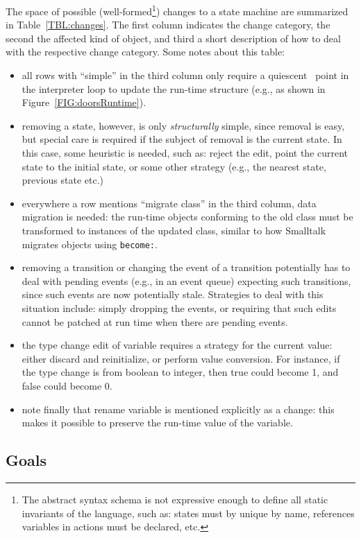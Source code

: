 \documentclass[english,submission]{programming}
\begin{document}
The space of possible (well-formed\footnote{The abstract syntax schema is not expressive enough to define all static invariants of the language, such as: states must by unique by name, references variables in actions must be declared, etc.}) changes to a state machine are summarized in Table~\ref{TBL:changes}.
The first column indicates the change category, the second the affected kind of object, and third a short description of how to deal with the respective change category. Some notes about this table:
\begin{itemize}
\item all rows with ``simple'' in the third column only require a quiescent~\cite{Tranquility} point in the interpreter loop to update the run-time structure (e.g., as shown in Figure~\ref{FIG:doorsRuntime}).
\item removing a state, however, is only \textit{structurally} simple, since removal is easy, but special care is required if the subject of removal is the current state. In this case, some heuristic is needed, such as: reject the edit, point the current state to the initial state, or some other strategy (e.g., the nearest state, previous state etc.)
\item everywhere a row mentions ``migrate class'' in the third column, data migration is needed: the run-time objects conforming to the old class must be transformed to instances of the updated class, similar to how Smalltalk migrates objects using \lstinline{become:}.
\item removing a transition or changing the event of a transition potentially has to deal with pending events (e.g., in an event queue) expecting such transitions, since such events are now potentially stale. Strategies to deal with this situation include: simply dropping the events, or requiring that such edits cannot be patched at run time when there are pending events.
\item the type change edit of variable requires a strategy for the current value: either discard and reinitialize, or perform value conversion. For instance, if the type change is from boolean to integer, then true could become 1, and false could become 0.
\item note finally that rename variable is mentioned explicitly as a change: this makes it possible to preserve the run-time value of the variable.
\end{itemize}

\subsection{Goals}
\end{document}
